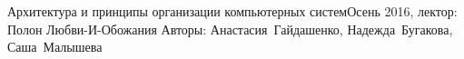 


\BigHeader
    {Архитектура и принципы организации компьютерных систем}{Осень 2016, лектор: Полон Любви-И-Обожания}
    {Авторы: Анастасия~Гайдашенко, Надежда~Бугакова, Саша~Малышева}

    



